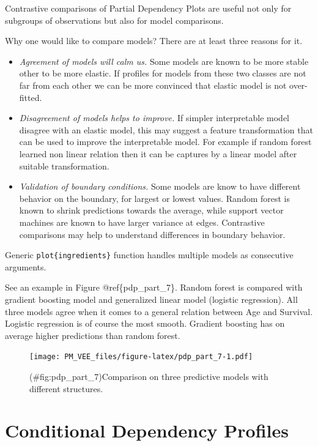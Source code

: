 \documentclass[12pt,]{krantz}
\providecommand{\tightlist}{%
  \setlength{\itemsep}{0pt}\setlength{\parskip}{0pt}}
\theoremstyle{definition}
\theoremstyle{definition}
\theoremstyle{definition}
\theoremstyle{remark}
\begin{document}
Contrastive comparisons of Partial Dependency Plots are useful not only
for subgroups of observations but also for model comparisons.

Why one would like to compare models? There are at least three reasons
for it.

\begin{itemize}
\tightlist
\item
  \emph{Agreement of models will calm us.} Some models are known to be
  more stable other to be more elastic. If profiles for models from
  these two classes are not far from each other we can be more convinced
  that elastic model is not over-fitted.
\item
  \emph{Disagreement of models helps to improve.} If simpler
  interpretable model disagree with an elastic model, this may suggest a
  feature transformation that can be used to improve the interpretable
  model. For example if random forest learned non linear relation then
  it can be captures by a linear model after suitable transformation.
\item
  \emph{Validation of boundary conditions.} Some models are know to have
  different behavior on the boundary, for largest or lowest values.
  Random forest is known to shrink predictions towards the average,
  while support vector machines are known to have larger variance at
  edges. Contrastive comparisons may help to understand differences in
  boundary behavior.
\end{itemize}

Generic \texttt{plot\{ingredients\}} function handles multiple models as
consecutive arguments.

See an example in Figure @ref\{pdp\_part\_7\}. Random forest is compared
with gradient boosting model and generalized linear model (logistic
regression). All three models agree when it comes to a general relation
between Age and Survival. Logistic regression is of course the most
smooth. Gradient boosting has on average higher predictions than random
forest.

\begin{figure}
\centering
\texttt{[image: PM\_VEE\_files/figure-latex/pdp\_part\_7-1.pdf]}
\caption{(\#fig:pdp\_part\_7)Comparison on three predictive models with
different structures.}
\end{figure}

\hypertarget{conditionalProfiles}{%
\section{Conditional Dependency Profiles}\label{conditionalProfiles}}
\end{document}
